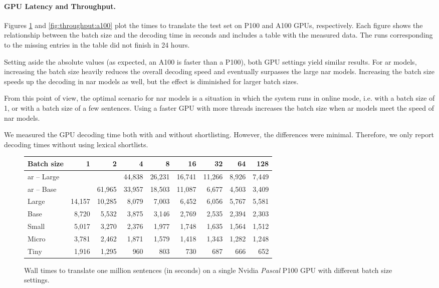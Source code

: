 \paragraph{GPU Latency and Throughput.}
Figures \ref{fig:throughput:p100} and \ref{fig:throughput:a100} plot the times
to translate the test set on P100 and A100 GPUs, respectively. Each figure
shows the relationship between the batch size and the decoding time in seconds
and includes a table with the measured data. The runs corresponding to the
missing entries in the table did not finish in 24 hours.

Setting aside the absolute values (as expected, an A100 is faster than a P100),
both GPU settings yield similar results. For \ac{ar} models, increasing the
batch size heavily reduces the overall decoding speed and eventually surpasses
the large \ac{nar} models. Increasing the batch size speeds up the decoding in
\ac{nar} models as well, but the effect is diminished for larger batch sizes.

From this point of view, the optimal scenario for \ac{nar} models is a
situation in which the system runs in online mode, i.e. with a batch size of
1, or with a batch size of a few sentences. Using a faster GPU with more
threads increases the batch size when \ac{ar} models meet the speed of \ac{nar}
models.

We measured the GPU decoding time both with and without shortlisting. However,
the differences were minimal. Therefore, we only report decoding times without
using lexical shortlists.

\begin{figure}
  \centering

  
  \vspace{1\baselineskip}

  \begin{tabular}{lrrrrrrrr}
    \toprule
    Batch size & 1 & 2 & 4 & 8 & 16 & 32 & 64 & 128\\
    \midrule
    \acs{ar} -- Large &&        & 44,838 & 26,231 & 16,741 & 11,266 & 8,926 & 7,449 \\
    \acs{ar} -- Base  && 61,965 & 33,957 & 18,503 & 11,087 &  6,677 & 4,503 & 3,409 \\
    \midrule
    Large & 14,157 & 10,285 & 8,079 & 7,003 & 6,452 & 6,056 & 5,767 & 5,581 \\
    Base  &  8,720 &  5,532 & 3,875 & 3,146 & 2,769 & 2,535 & 2,394 & 2,303 \\
    Small &  5,017 &  3,270 & 2,376 & 1,977 & 1,748 & 1,635 & 1,564 & 1,512 \\
    Micro &  3,781 &  2,462 & 1,871 & 1,579 & 1,418 & 1,343 & 1,282 & 1,248 \\
    Tiny  &  1,916 &  1,295 &   960 &   803 &   730 &   687 &   666 &   652 \\
    \bottomrule
  \end{tabular}

  \caption{Wall times to translate one million sentences (in seconds) on a
    single Nvidia \emph{Pascal} P100 GPU with different batch size settings.}%
  \label{fig:throughput:p100}
\end{figure}


